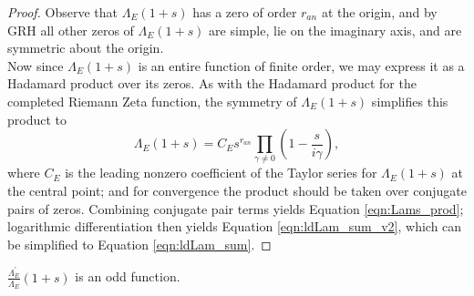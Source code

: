 \documentclass[10pt]{article}
\newcommand{\pr}{^{\prime}}
\newcommand{\ldLam}[1]{\frac{\Lambda_E\pr}{\Lambda_E}\left(#1\right)}
\begin{document}
\begin{proof}
Observe that $\Lambda_E(1+s)$ has a zero of order $r_{an}$ at the origin, and by GRH all other zeros of $\Lambda_E(1+s)$ are simple, lie on the imaginary axis, and are symmetric about the origin. \\

Now since $\Lambda_E(1+s)$ is an entire function of finite order, we may express it as a Hadamard product over its zeros. As with the Hadamard product for the completed Riemann Zeta function, the symmetry of $\Lambda_E(1+s)$ simplifies this product to
\begin{equation}
\Lambda_E(1+s) = C_E s^{r_{an}}\prod_{\gamma\ne0}\left(1-\frac{s}{i\gamma}\right),
\end{equation}
where $C_E$ is the leading nonzero coefficient of the Taylor series for $\Lambda_E(1+s)$ at the central point; and for convergence the product should be taken over conjugate pairs of zeros. Combining conjugate pair terms yields Equation \ref{eqn:Lams_prod}; logarithmic differentiation then yields Equation \ref{eqn:ldLam_sum_v2}, which can be simplified to Equation \ref{eqn:ldLam_sum}.
\end{proof}

\begin{corollary}
$\ldLam{1+s}$ is an odd function.
\end{corollary}
\end{document}
